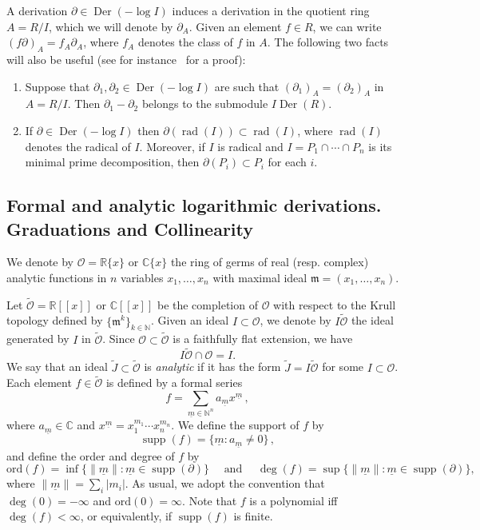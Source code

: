 \documentclass[10pt,twoside,reqno]{amsart}
\theoremstyle{remark}
\theoremstyle{remark}
\newcommand{\N}{\mathbb{N}}
\newcommand{\um}{{\underline m}}
\newcommand{\supp}{\operatorname{supp}}
\newcommand{\nobracket}{}
\newcommand{\tmem}[1]{{\em #1\/}}
\newcommand{\tmop}[1]{{\operatorname{#1}}}
\newcommand{\ord}{\mathrm{ord}}
\newcommand{\tO}{\widetilde{\mathcal{O}}}
\begin{document}
A derivation $\partial \in \tmop{Der} (- \log I)$ induces a derivation in the
quotient ring $A = R / I$, which we will denote by $\partial_A$. Given an
element $f \in R$, we can write $(f \partial)_A = f_A \partial_A$, where $f_A$
denotes the class of $f$ in $A$.  
The following two facts will also be useful (see for instance~\cite{Seidenberg67} for a proof):
\begin{enumerate}
    \item[(D.1)] Suppose that $\partial_1, \partial_2 \in \tmop{Der} (- \log I)$ are such
that $(\partial_1)_A = (\partial_2)_A$ in $A = R / I$. Then $\partial_1 -
\partial_2$ belongs to the submodule $I \tmop{Der} (R)$.
\item[(D.2)] If $\partial \in \tmop{Der} (- \log I)$ then $\partial (\tmop{rad} (I))
\subset \tmop{rad} (I)$, where $\tmop{rad}(I)$ denotes the radical of $I$. Moreover, if $I$ is radical and $I = P_1 \cap \cdots
\cap P_n$ is its minimal prime decomposition, then $\partial (P_i) \subset P_i$
for each $i$. 
\end{enumerate}

\subsection{Formal and analytic logarithmic derivations. Graduations and Collinearity}\label{subsect-ideals-expansions}

We denote by $\mathcal{O} =\mathbb{R} \{ x \}$ or $\mathbb{C} \{ x \}$ the
ring of germs of real (resp. complex) analytic functions in $n$ variables
$x_1, \ldots, x_n$ with maximal ideal $\mathfrak{m} = (x_1, \ldots, x_n)$.

Let $\widetilde{\mathcal{O}} =\mathbb{R} [[\nobracket x]] \nobracket$ or
$\mathbb{C} [[x]]$ be the completion of $\mathcal{O}$ with respect to the
Krull topology defined by $\{ \mathfrak{m}^k \}_{k \in \mathbb{N}}$.
Given an ideal $I \subset \mathcal{O}$, we denote by $I
\widetilde{\mathcal{O}}$ the ideal generated by $I$ in $\widetilde{\mathcal{}
\mathcal{O}}$. Since $\mathcal{O} \subset \widetilde{\mathcal{O}}$ is a
faithfully flat extension, we have
\[ I \widetilde{\mathcal{O}} \cap \mathcal{O} = I . \]
We say that an ideal $\tilde{J} \subset \widetilde{\mathcal{O}}$ is
{\tmem{analytic}} if it has the form $\tilde{J} = I \widetilde{\mathcal{O}}$
for some $I \subset \mathcal{O}$.
Each element $f \in \tO$ is defined by a formal series
$$f = \sum_{\underline{m}\in \N^n} a_{\um} x^{\underline{m}}\, ,$$
where $a_\um \in \mathbb{C}$ and $x^\um=x_1^{m_1} \cdots x_n^{m_n}$. We define the support of $f$ by 
$$\supp(f) = \{ {\um}:a_{\um} \ne 0\}\, ,$$ 
and define the order and degree of $f$ by
\begin{equation}\label{def-degree-order}
\ord(f) = \inf\{\|\um\|: \um \in \supp(\partial)\}\quad \text{ and }\quad \deg(f) = \sup\{\|\um\|: \um \in \supp(\partial)\},
\end{equation}
where $\|\um\| = \sum_i |m_i|$. As usual, we adopt the convention that $\deg(0)=-\infty$ and $\ord(0)=\infty$. Note that $f$ is a polynomial iff $\deg(f) < \infty$, or equivalently, if $\supp(f)$ is finite. 
\end{document}
